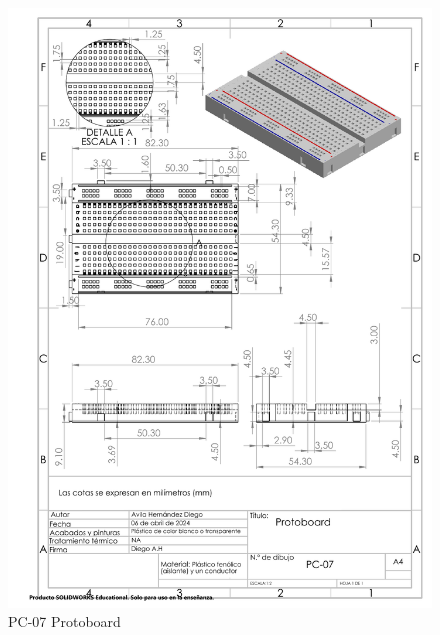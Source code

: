     \begin{figure}[H]
        \centering
        \includegraphics[scale=0.4]{3/Img/protoboardDibujo.pdf}
        \caption{PC-07 Protoboard} 
        \label{fig:protoboardDibujo}
    \end{figure}
